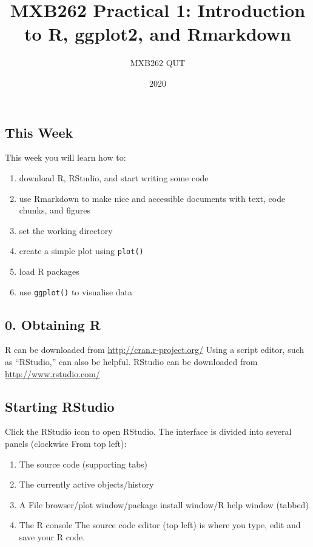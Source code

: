 \documentclass[]{article}
\title{MXB262 Practical 1: Introduction to R, ggplot2, and Rmarkdown}
\author{MXB262 QUT}
\date{2020}
\providecommand{\tightlist}{%
  \setlength{\itemsep}{0pt}\setlength{\parskip}{0pt}}
\begin{document}
\maketitle

\hypertarget{this-week}{%
\subsection{This Week}\label{this-week}}

This week you will learn how to:

\begin{enumerate}
\def\labelenumi{\arabic{enumi}.}
\setcounter{enumi}{-1}
\tightlist
\item
  download R, RStudio, and start writing some code
\item
  use Rmarkdown to make nice and accessible documents with text, code
  chunks, and figures\\
\item
  set the working directory\\
\item
  create a simple plot using \texttt{plot()}
\item
  load R packages
\item
  use \texttt{ggplot()} to visualise data
\end{enumerate}

\hypertarget{obtaining-r}{%
\subsection{0. Obtaining R}\label{obtaining-r}}

R can be downloaded from \url{http://cran.r‐project.org/} Using a script
editor, such as ``RStudio,'' can also be helpful. RStudio can be
downloaded from \url{http://www.rstudio.com/}

\hypertarget{starting-rstudio}{%
\subsection{Starting RStudio}\label{starting-rstudio}}

Click the RStudio icon to open RStudio. The interface is divided into
several panels (clockwise From top left):

\begin{enumerate}
\def\labelenumi{\arabic{enumi}.}
\tightlist
\item
  The source code (supporting tabs)
\item
  The currently active objects/history
\item
  A File browser/plot window/package install window/R help window
  (tabbed)
\item
  The R console The source code editor (top left) is where you type,
  edit and save your R code.
\end{enumerate}
\end{document}
